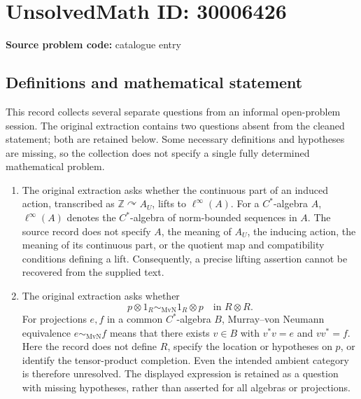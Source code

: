 \documentclass[11pt]{article}
\newcommand{\Z}{\mathbb{Z}}
\begin{document}
\section*{UnsolvedMath ID: 30006426}
\textbf{Source problem code:} catalogue entry
\subsection{Definitions and mathematical statement}
This record collects several separate questions from an informal open-problem session. The original extraction contains two questions absent from the cleaned statement; both are retained below. Some necessary definitions and hypotheses are missing, so the collection does not specify a single fully determined mathematical problem.

\begin{enumerate}
\item The original extraction asks whether the continuous part of an induced action, transcribed as \(\Z\curvearrowright A_U\), lifts to \(\ell^\infty(A)\). For a \(C^*\)-algebra \(A\), \(\ell^\infty(A)\) denotes the \(C^*\)-algebra of norm-bounded sequences in \(A\). The source record does not specify \(A\), the meaning of \(A_U\), the inducing action, the meaning of its continuous part, or the quotient map and compatibility conditions defining a lift. Consequently, a precise lifting assertion cannot be recovered from the supplied text.

\item The original extraction asks whether
\[
 p\otimes 1_R\sim_{\mathrm{MvN}}1_R\otimes p
 \quad\text{in }R\otimes R.
\]
For projections \(e,f\) in a common \(C^*\)-algebra \(B\), Murray--von Neumann equivalence \(e\sim_{\mathrm{MvN}}f\) means that there exists \(v\in B\) with \(v^*v=e\) and \(vv^*=f\). Here the record does not define \(R\), specify the location or hypotheses on \(p\), or identify the tensor-product completion. Even the intended ambient category is therefore unresolved. The displayed expression is retained as a question with missing hypotheses, rather than asserted for all algebras or projections.


\end{enumerate}
\end{document}
